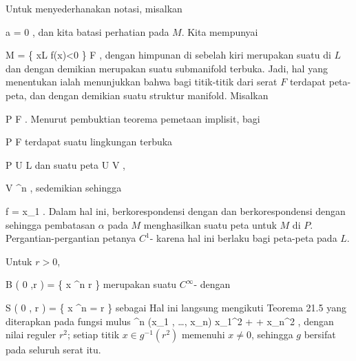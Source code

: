 {

Untuk menyederhanakan notasi, misalkan

\mavergleichskette
{\vergleichskette
{ a
}
{ = }{ 0
}
{  }{
}
{    }{
}
{   }{
}
}
{}{}{,}
dan kita batasi perhatian pada $M$. Kita mempunyai

\mavergleichskettedisp
{\vergleichskette
{ M
}
{ =} { \left\{  x\in L  \mid  f(x)<0        \right\}  \uplus F
}
{ } {
}
{ } {
}
{ } {
}
}
{}{}{,}
dengan himpunan di sebelah kiri merupakan suatu
di $L$ dan dengan demikian merupakan suatu submanifold terbuka. Jadi, hal yang menentukan ialah menunjukkan bahwa bagi titik-titik dari serat $F$ terdapat peta-peta, dan dengan demikian suatu struktur manifold. Misalkan

\mavergleichskette
{\vergleichskette
{ P
}
{ \in }{ F
}
{  }{
}
{    }{
}
{   }{
}
}
{}{}{.}
Menurut pembuktian
teorema pemetaan implisit,
bagi

\mavergleichskette
{\vergleichskette
{ P
}
{ \in }{ F
}
{  }{
}
{    }{
}
{   }{
}
}
{}{}{}
terdapat suatu lingkungan
 {} {}
terbuka

\mavergleichskette
{\vergleichskette
{ P
}
{ \in }{ U
}
{ \subseteq }{ L
}
{    }{
}
{   }{
}
}
{}{}{}
dan suatu peta
\maabbdisp {\alpha} { U } { V
} {,}

\mavergleichskette
{\vergleichskette
{ V
}
{ \subseteq }{ \R^n
}
{  }{
}
{    }{
}
{   }{
}
}
{}{}{,}
sedemikian sehingga

\mavergleichskette
{\vergleichskette
{ f
}
{ = }{ x_1 \circ \alpha
}
{  }{
}
{    }{
}
{   }{
}
}
{}{}{.}
Dalam hal ini,
 berkorespondensi dengan
 dan
 berkorespondensi dengan
 sehingga pembatasan $\alpha$ pada $M$ menghasilkan suatu peta untuk $M$ di $P$. Pergantian-pergantian petanya
$C^1$-
karena hal ini berlaku bagi peta-peta
 {} {}
pada $L$.

}

{

Untuk $r>0$, 

\mavergleichskettedisp
{\vergleichskette
{ B  \left(  0 ,r \right)
}
{ =} { \left\{  x \in \R^n   \mid   {} \leq r         \right\}
}
{ } {
}
{ } {
}
{ } {
}
}
{}{}{}
merupakan suatu
$C^\infty$-
dengan  {}

\mavergleichskettedisp
{\vergleichskette
{ S \left(   0 , r  \right)
}
{ =} { \left\{  x \in \R^n   \mid   {} =  r         \right\}
}
{ } {
}
{ } {
}
{ } {
}
}
{}{}{}
sebagai
Hal ini langsung mengikuti
Teorema 21.5
yang diterapkan pada fungsi mulus
 {\R^n } {\R
} {(x_1 , \ldots , x_n) } { x_1^2 + \cdots + x_n^2
} {,}
dengan nilai reguler $r^2$; setiap titik $x\in g^{-1}(r^2)$ memenuhi
$x\neq 0$, sehingga $g$ bersifat
 pada seluruh serat itu.

}

